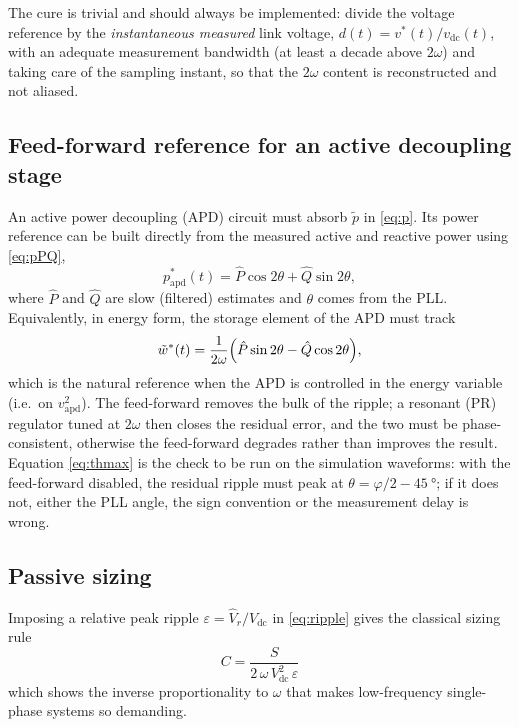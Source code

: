 \documentclass[11pt,a4paper]{article}
\begin{document}
The cure is trivial and should always be implemented: divide the voltage
reference by the \emph{instantaneous measured} link voltage,
$d(t)=v^{*}(t)/v_{\mathrm{dc}}(t)$, with an adequate measurement bandwidth
(at least a decade above $2\omega$) and taking care of the sampling instant, so
that the $2\omega$ content is reconstructed and not aliased.

\subsection{Feed-forward reference for an active decoupling stage}

An active power decoupling (APD) circuit must absorb $\tilde p$ in
\eqref{eq:p}. Its power reference can be built directly from the measured
active and reactive power using \eqref{eq:pPQ},
\begin{equation}
  p^{*}_{\mathrm{apd}}(t) = \hat P \cos 2\theta + \hat Q \sin 2\theta ,
\end{equation}
where $\hat P$ and $\hat Q$ are slow (filtered) estimates and $\theta$ comes
from the PLL. Equivalently, in energy form, the storage element of the APD must
track
\begin{equation}
  \tilde w^{*}(t) = \frac{1}{2\omega}
  \Bigl(\hat P \sin 2\theta - \hat Q \cos 2\theta\Bigr),
\end{equation}
which is the natural reference when the APD is controlled in the
energy variable (i.e.\ on $v_{\mathrm{apd}}^2$). The feed-forward removes the
bulk of the ripple; a resonant (PR) regulator tuned at $2\omega$ then closes the
residual error, and the two must be phase-consistent, otherwise the
feed-forward degrades rather than improves the result. Equation
\eqref{eq:thmax} is the check to be run on the simulation waveforms: with the
feed-forward disabled, the residual ripple must peak at
$\theta = \varphi/2 - \SI{45}{\degree}$; if it does not, either the PLL angle,
the sign convention or the measurement delay is wrong.

\subsection{Passive sizing}

Imposing a relative peak ripple $\varepsilon = \hat V_r / V_{\mathrm{dc}}$ in
\eqref{eq:ripple} gives the classical sizing rule
\begin{equation}
  \boxed{\;
  C = \frac{S}{2\,\omega\, V_{\mathrm{dc}}^{2}\, \varepsilon} \;}
  \label{eq:C}
\end{equation}
which shows the inverse proportionality to $\omega$ that makes low-frequency
single-phase systems so demanding.
\end{document}
